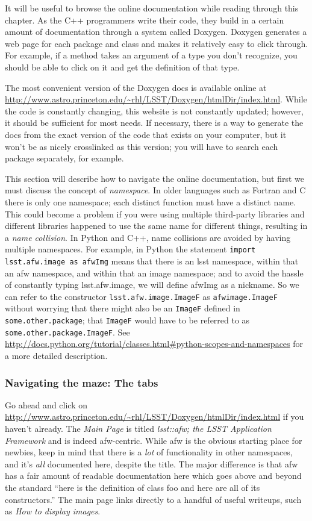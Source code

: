 \documentclass{book}
\begin{document}
It will be useful to browse the online documentation while reading
through this chapter.  As the C++ programmers write their code, they
build in a certain amount of documentation through a system called
Doxygen.  Doxygen generates a web page for each package and class and
makes it relatively easy to click through.  For example, if a method
takes an argument of a type you don't recognize, you should be able to
click on it and get the definition of that type.

The most convenient version of the Doxygen docs is available online at
\url{http://www.astro.princeton.edu/~rhl/LSST/Doxygen/htmlDir/index.html}.
While the code is constantly changing, this website is not constantly
updated; however, it should be sufficient for most needs.  If necessary,
there is a way to generate the docs from the exact version of the code that
exists on your computer, but it won't be as nicely crosslinked as this
version; you will have to search each package separately, for example.

This section will describe how to navigate the online documentation,
but first we must discuss the concept of {\it namespace}.  In older
languages such as Fortran and C there is only one namespace; each
distinct function must have a distinct name.  This could become a
problem if you were using multiple third-party libraries and different
libraries happened to use the same name for different things,
resulting in a {\it name collision}.  In Python and C++, name
collisions are avoided by having multiple namespaces.  For example, in
Python the statement \texttt{import lsst.afw.image as afwImg} means
that there is an lsst namespace, within that an afw namespace, and
within that an image namespace; and to avoid the hassle of constantly
typing lsst.afw.image, we will define afwImg as a nickname.  So we can
refer to the constructor \texttt{lsst.afw.image.ImageF} as \texttt{afwimage.ImageF}
without worrying that there might also be an \texttt{ImageF} defined
in \texttt{some.other.package}; that \texttt{ImageF} would have to be
referred to as \texttt{some.other.package.ImageF}.  See
\url{http://docs.python.org/tutorial/classes.html#python-scopes-and-namespaces}
for a more detailed description.


\subsubsection{Navigating the maze:  The tabs}

Go ahead and click on
\url{http://www.astro.princeton.edu/~rhl/LSST/Doxygen/htmlDir/index.html}
if you haven't already.  The {\it Main Page} is titled {\it lsst::afw; the
LSST Application Framework} and is indeed afw-centric.  While afw is
the obvious starting place for newbies, keep in mind that there is a
{\it lot} of functionality in other namespaces, and it's {\it all}
documented here, despite the title.  The major difference is that afw
has a fair amount of readable documentation here which goes above and
beyond the standard ``here is the definition of class foo and here are
all of its constructors.''  The main page links directly to a handful
of useful writeups, such as {\it How to display images}.
\end{document}
